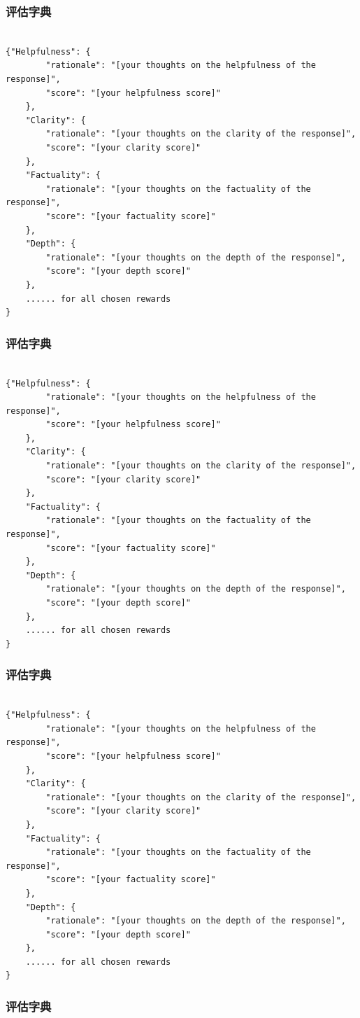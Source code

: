 \subsubsection{评估字典}  
\label{sec:eval_dict}  
\begin{lstlisting}[breaklines=true,breakatwhitespace=true]

{"Helpfulness": {
        "rationale": "[your thoughts on the helpfulness of the response]",
        "score": "[your helpfulness score]"
    },
    "Clarity": {
        "rationale": "[your thoughts on the clarity of the response]",
        "score": "[your clarity score]"
    },
    "Factuality": {
        "rationale": "[your thoughts on the factuality of the response]",
        "score": "[your factuality score]"
    },
    "Depth": {
        "rationale": "[your thoughts on the depth of the response]",
        "score": "[your depth score]"
    },
    ...... for all chosen rewards
}

\end{lstlisting}  \subsubsection{评估字典}  
\label{sec:eval_dict}  
\begin{lstlisting}[breaklines=true,breakatwhitespace=true]

{"Helpfulness": {
        "rationale": "[your thoughts on the helpfulness of the response]",
        "score": "[your helpfulness score]"
    },
    "Clarity": {
        "rationale": "[your thoughts on the clarity of the response]",
        "score": "[your clarity score]"
    },
    "Factuality": {
        "rationale": "[your thoughts on the factuality of the response]",
        "score": "[your factuality score]"
    },
    "Depth": {
        "rationale": "[your thoughts on the depth of the response]",
        "score": "[your depth score]"
    },
    ...... for all chosen rewards
}

\end{lstlisting}  \subsubsection{评估字典}  
\label{sec:eval_dict}  
\begin{lstlisting}[breaklines=true,breakatwhitespace=true]

{"Helpfulness": {
        "rationale": "[your thoughts on the helpfulness of the response]",
        "score": "[your helpfulness score]"
    },
    "Clarity": {
        "rationale": "[your thoughts on the clarity of the response]",
        "score": "[your clarity score]"
    },
    "Factuality": {
        "rationale": "[your thoughts on the factuality of the response]",
        "score": "[your factuality score]"
    },
    "Depth": {
        "rationale": "[your thoughts on the depth of the response]",
        "score": "[your depth score]"
    },
    ...... for all chosen rewards
}

\end{lstlisting}  \subsubsection{评估字典}  

